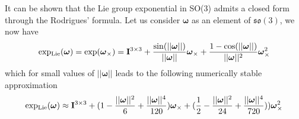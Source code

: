 It can be shown that the Lie group exponential in SO(3) admits a closed form through the Rodrigues’ formula. Let us consider $\boldsymbol{\omega}$ as an element of $\mathfrak{so}(3)$, we now have
\begin{equation}
\operatorname{exp_{Lie}}(\boldsymbol{\omega}) = \exp(\boldsymbol{\omega}_\times) = \mathbf{I}^{3\times3} + \frac{\sin(||\boldsymbol{\omega}||)}{||\boldsymbol{\omega}||}\boldsymbol{\omega}_\times + \frac{1-\cos(||\boldsymbol{\omega}||)}{||\boldsymbol{\omega}||^2}\boldsymbol{\omega}_\times^2
\end{equation}
which for small values of $||\boldsymbol{\omega}||$ leads to the following numerically stable approximation
\begin{equation}
\operatorname{exp_{Lie}}(\boldsymbol{\omega}) \approx \mathbf{I}^{3\times3}
+ (1-\frac{||\boldsymbol{\omega}||^2}{6}+\frac{||\boldsymbol{\omega}||^4}{120})\boldsymbol{\omega}_\times
+ (\frac{1}{2}-\frac{||\boldsymbol{\omega}||^2}{24}+\frac{||\boldsymbol{\omega}||^4}{720}))\boldsymbol{\omega}_\times^2
\end{equation}

